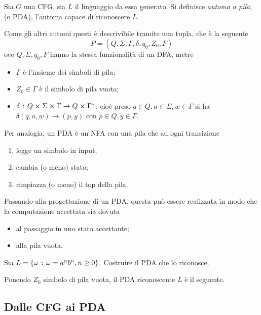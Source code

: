 \documentclass{subfiles}
\begin{document}
\begin{Definition*}
    Sia \(G\) una CFG, sia \(L\) il linguaggio da essa generato. Si definisce \emph{automa a pila}, (o PDA),  l'automa capace di riconoscere \(L\).

    \noindent Come gli altri automi questi è descrivibile tramite una tupla, che è la seguente
    \[
        P = (Q, \Sigma, \Gamma, \delta, q_{0}, Z_{0}, F)
    \]
    ove \(Q, \Sigma, q_{0}, F\) hanno la stessa funzionalità di un DFA, metre
    \begin{itemize}
        \item \(\Gamma\) è l'insieme dei simboli di pila;
        \item \(Z_{0} \in \Gamma\) è il simbolo di pila vuota;
        \item \(\delta \such Q \cp \Sigma \cp \Gamma \to Q \cp \Gamma^{*}\): cioè preso \(q \in Q, a \in \Sigma, w \in \Gamma\) si ha \(\delta(q, a, w) \to (p, y)\) con \(p \in Q, y \in \Gamma\).
    \end{itemize}
\end{Definition*}

\noindent Per analogia, un PDA è un NFA con una pila che ad ogni transizione
\begin{enumerate}
    \item legge un simbolo in input;
    \item cambia (o meno) stato;
    \item rimpiazza (o meno) il top della pila.
\end{enumerate}

\noindent Passando alla progettazione di un PDA, questa può essere realizzata in modo che la computazione accettata sia dovuta
\begin{itemize}
    \item al passaggio in uno stato accettante;
    \item alla pila vuota.
\end{itemize}

\begin{Example*}
    Sia \(L = \left\{\omega \operatorname{\: {:} \:} \omega = a^{n}b^{n}, n \ge 0\right\}\). Costruire il PDA che lo riconosce.
    \begin{Solution*}
        Ponendo \(Z_{0}\) simbolo di pila vuota, il PDA riconoscente \(L\) è il seguente.
        
    \end{Solution*}
\end{Example*}
\clearpage

\subsection{Dalle CFG ai PDA}

\end{document}
